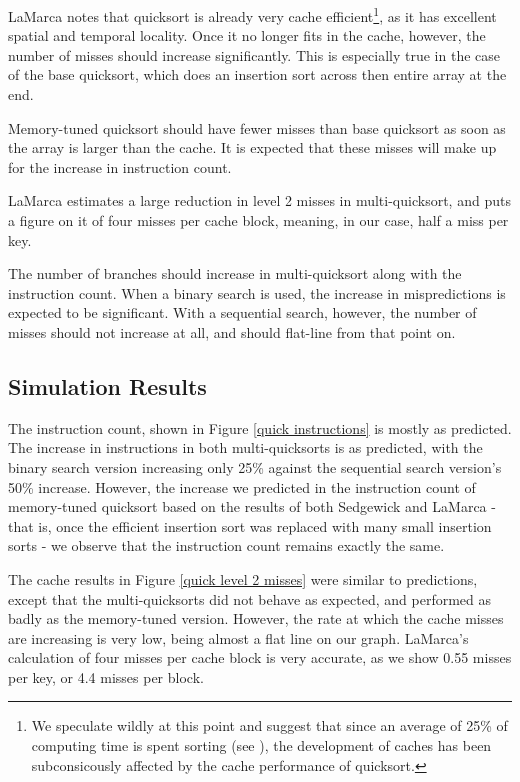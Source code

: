 LaMarca notes that quicksort is already very cache efficient\footnote{We
speculate wildly at this point and suggest that since an average of 25\% of
computing time is spent sorting (see \cite{TODO}), the development of caches has
been subconsicously affected by the cache performance of quicksort.}, as it has
excellent spatial and temporal locality. Once it no longer fits in the cache,
however, the number of misses should increase significantly. This is especially
true in the case of the base quicksort, which does an insertion sort across then
entire array at the end.

Memory-tuned quicksort should have fewer misses than base quicksort as soon as
the array is larger than the cache. It is expected that these misses will make
up for the increase in instruction count.

LaMarca estimates a large reduction in level 2 misses in multi-quicksort, and
puts a figure on it of four misses per cache block, meaning, in our case, half a
miss per key.

The number of branches should increase in multi-quicksort along with the
instruction count. When a binary search is used, the increase in mispredictions
is expected to be significant. With a sequential search, however, the number of
misses should not increase at all, and should flat-line from that point on.

\subsection{Simulation Results}


The instruction count, shown in Figure \ref{quick instructions} is mostly as
predicted. The increase in instructions in both multi-quicksorts is as
predicted, with the binary search version increasing only 25\% against the
sequential search version's 50\% increase. However, the increase we predicted in
the instruction count of memory-tuned quicksort based on the results of both
Sedgewick and LaMarca - that is, once the efficient insertion sort was replaced
with many small insertion sorts - we observe that the instruction count remains
exactly the same.

The cache results in Figure \ref{quick level 2 misses} were similar to
predictions, except that the multi-quicksorts did not behave as expected, and
performed as badly as the memory-tuned version. However, the rate at which the
cache misses are increasing is very low, being almost a flat line on our graph.
LaMarca's calculation of four misses per cache block is very accurate, as we
show 0.55 misses per key, or 4.4 misses per block.

